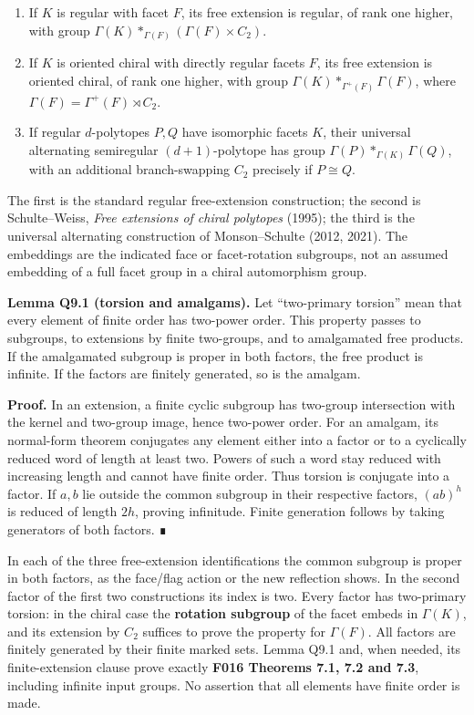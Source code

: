 \documentclass[
  10pt,
  letterpaper,
]{article}
\providecommand{\tightlist}{%
  \setlength{\itemsep}{0pt}\setlength{\parskip}{0pt}}
\begin{document}
\begin{enumerate}
\def\labelenumi{\arabic{enumi}.}
\tightlist
\item
  If \(K\) is regular with facet \(F\), its free extension is regular,
  of rank one higher, with group
  \(\Gamma(K)*_{\Gamma(F)}(\Gamma(F)\times C_2)\).
\item
  If \(K\) is oriented chiral with directly regular facets \(F\), its
  free extension is oriented chiral, of rank one higher, with group
  \(\Gamma(K)*_{\Gamma^+(F)}\Gamma(F)\), where
  \(\Gamma(F)=\Gamma^+(F)\rtimes C_2\).
\item
  If regular \(d\)-polytopes \(P,Q\) have isomorphic facets \(K\), their
  universal alternating semiregular \((d+1)\)-polytope has group
  \(\Gamma(P)*_{\Gamma(K)}\Gamma(Q)\), with an additional
  branch-swapping \(C_2\) precisely if \(P\cong Q\).
\end{enumerate}

The first is the standard regular free-extension construction; the
second is Schulte--Weiss, \emph{Free extensions of chiral polytopes}
(1995); the third is the universal alternating construction of
Monson--Schulte (2012, 2021). The embeddings are the indicated face or
facet-rotation subgroups, not an assumed embedding of a full facet group
in a chiral automorphism group.

\textbf{Lemma Q9.1 (torsion and amalgams).} Let ``two-primary torsion''
mean that every element of finite order has two-power order. This
property passes to subgroups, to extensions by finite two-groups, and to
amalgamated free products. If the amalgamated subgroup is proper in both
factors, the free product is infinite. If the factors are finitely
generated, so is the amalgam.

\textbf{Proof.} In an extension, a finite cyclic subgroup has two-group
intersection with the kernel and two-group image, hence two-power order.
For an amalgam, its normal-form theorem conjugates any element either
into a factor or to a cyclically reduced word of length at least two.
Powers of such a word stay reduced with increasing length and cannot
have finite order. Thus torsion is conjugate into a factor. If \(a,b\)
lie outside the common subgroup in their respective factors, \((ab)^h\)
is reduced of length \(2h\), proving infinitude. Finite generation
follows by taking generators of both factors. ∎

In each of the three free-extension identifications the common subgroup
is proper in both factors, as the face/flag action or the new reflection
shows. In the second factor of the first two constructions its index is
two. Every factor has two-primary torsion: in the chiral case the
\textbf{rotation subgroup} of the facet embeds in \(\Gamma(K)\), and its
extension by \(C_2\) suffices to prove the property for \(\Gamma(F)\).
All factors are finitely generated by their finite marked sets. Lemma
Q9.1 and, when needed, its finite-extension clause prove exactly
\textbf{F016 Theorems 7.1, 7.2 and 7.3}, including infinite input
groups. No assertion that all elements have finite order is made.
\end{document}

